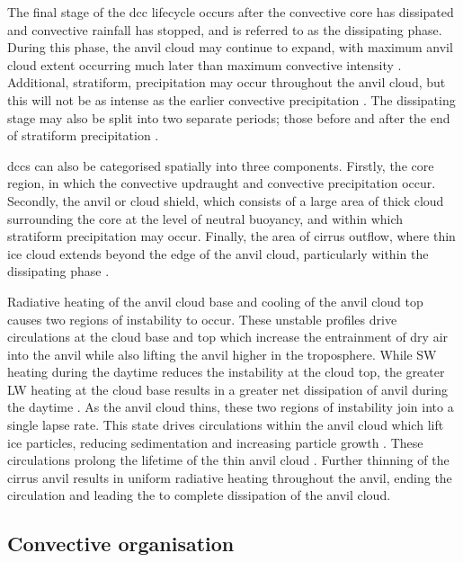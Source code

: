 The final stage of the \acrshort{dcc} lifecycle occurs after the convective core has dissipated and convective rainfall has stopped, and is referred to as the dissipating phase.
During this phase, the anvil cloud may continue to expand, with maximum anvil cloud extent occurring much later than maximum convective intensity \citep{futyan_deep_2007}.
Additional, stratiform, precipitation may occur throughout the anvil cloud, but this will not be as intense as the earlier convective precipitation \citep{houze_chapter_2014}.
The dissipating stage may also be split into two separate periods; those before and after the end of stratiform precipitation \citep{wall_life_2018}.

\acrshort{dcc}s can also be categorised spatially into three components.
Firstly, the core region, in which the convective updraught and convective precipitation occur.
Secondly, the anvil or cloud shield, which consists of a large area of thick cloud surrounding the core at the level of neutral buoyancy, and within which stratiform precipitation may occur.
Finally, the area of cirrus outflow, where thin ice cloud extends beyond the edge of the anvil cloud, particularly within the dissipating phase \citep{lilly_cirrus_1988}.

Radiative heating of the anvil cloud base and cooling of the anvil cloud top causes two regions of instability to occur. 
These unstable profiles drive circulations at the cloud base and top which increase the entrainment of dry air into the anvil while also lifting the anvil higher in the troposphere. 
While SW heating during the daytime reduces the instability at the cloud top, the greater LW heating at the cloud base results in a greater net dissipation of anvil during the daytime \citep{sokol_tropical_2020}. 
As the anvil cloud thins, these two regions of instability join into a single lapse rate. 
This state drives circulations within the anvil cloud which lift ice particles, reducing sedimentation and increasing particle growth \citep{gasparini_opinion_2023}. 
These circulations prolong the lifetime of the thin anvil cloud \citep{sokol_tropical_2020}. 
Further thinning of the cirrus anvil results in uniform radiative heating throughout the anvil, ending the circulation and leading the to complete dissipation of the anvil cloud. 


\subsection{Convective organisation}

